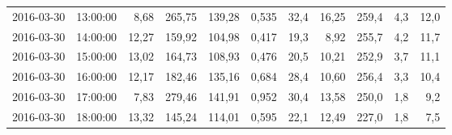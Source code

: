 \documentclass[]{VUMIFTemplateClass}
\begin{document}
\begin{table}[H]
{\begin{tabular}{|l|c|r|r|r|r|r|r|r|r|r|}
                2016-03-30    & 13:00:00        & 8,68             & 265,75           & 139,28            & 0,535            & 32,4                  & 16,25                  & 259,4                & 4,3                  & 12,0           \\
                2016-03-30    & 14:00:00        & 12,27            & 159,92           & 104,98            & 0,417            & 19,3                  & 8,92                   & 255,7                & 4,2                  & 11,7           \\
                2016-03-30    & 15:00:00        & 13,02            & 164,73           & 108,93            & 0,476            & 20,5                  & 10,21                  & 252,9                & 3,7                  & 11,1           \\
                2016-03-30    & 16:00:00        & 12,17            & 182,46           & 135,16            & 0,684            & 28,4                  & 10,60                  & 256,4                & 3,3                  & 10,4           \\
                2016-03-30    & 17:00:00        & 7,83             & 279,46           & 141,91            & 0,952            & 30,4                  & 13,58                  & 250,0                & 1,8                  & 9,2            \\
                2016-03-30    & 18:00:00        & 13,32            & 145,24           & 114,01            & 0,595            & 22,1                  & 12,49                  & 227,0                & 1,8                  & 7,5            \\
                \hline
            \end{tabular}
        }
        \label{tab:raw_data_sample}
    \end{table}
\end{document}
